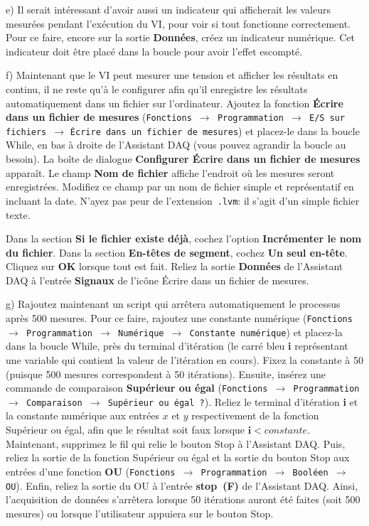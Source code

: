 \documentclass[canadien,12pt,oneside,letterpaper]{article}
\begin{document}
e) Il serait intéressant d'avoir aussi un indicateur qui afficherait les valeurs mesurées pendant l'exécution du VI, pour voir si tout fonctionne correctement. Pour ce faire, encore sur la sortie \textbf{Données}, créez un indicateur numérique. Cet indicateur doit être placé dans la boucle pour avoir l'effet escompté.

f) Maintenant que le VI peut mesurer une tension et afficher les résultats en continu, il ne reste qu'à le configurer afin qu'il enregistre les résultats automatiquement dans un fichier sur l'ordinateur. Ajoutez la fonction \textbf{Écrire dans un fichier de mesures} (\texttt{Fonctions $\rightarrow$ Programmation $\rightarrow$ E/S sur fichiers $\rightarrow$} \texttt{Écrire dans un fichier de mesures}) et placez-le dans la boucle While, en bas à droite de l'Assistant DAQ (vous pouvez agrandir la boucle au besoin). La boîte de dialogue \textbf{Configurer Écrire dans un fichier de mesures} apparaît. Le champ \textbf{Nom de fichier} affiche l'endroit où les mesures seront enregistrées. Modifiez ce champ par un nom de fichier simple et représentatif en incluant la date. N'ayez pas peur de l'extension~\texttt{.lvm}: il s'agit d'un simple fichier texte.

Dans la section \textbf{Si le fichier existe déjà}, cochez l'option \textbf{Incrémenter le nom du fichier}. Dans la section \textbf{En-têtes de segment}, cochez \textbf{Un seul en-tête}. Cliquez sur \textbf{OK} lorsque tout est fait. Reliez la sortie \textbf{Données} de l'Assistant DAQ à l'entrée \textbf{Signaux} de l'icône Écrire dans un fichier de mesures.

g) Rajoutez maintenant un script qui arrêtera automatiquement le processus après 500 mesures. Pour ce faire, rajoutez une constante numérique (\texttt{Fonctions $\rightarrow$ Programmation $\rightarrow$ Numérique $\rightarrow$ Constante numérique}) et placez-la dans la boucle While, près du terminal d'itération (le carré bleu \textbf{i} représentant une variable qui contient la valeur de l'itération en cours). Fixez la constante à 50 (puisque 500 mesures correspondent à 50 itérations). Ensuite, insérez une commande de comparaison \textbf{Supérieur ou égal} (\texttt{Fonctions $\rightarrow$ Programmation $\rightarrow$ Comparaison $\rightarrow$ Supérieur ou égal~?}). Reliez le terminal d'itération \textbf{i} et la constante numérique aux entrées $x$ et $y$ respectivement de la fonction Supérieur ou égal, afin que le résultat soit faux lorsque $\mathbf{i}<constante$. Maintenant, supprimez le fil qui relie le bouton Stop à l'Assistant DAQ. Puis, reliez la sortie de la fonction Supérieur ou égal et la sortie du bouton Stop aux entrées d'une fonction \textbf{OU} (\texttt{Fonctions $\rightarrow$ Programmation $\rightarrow$ Booléen $\rightarrow$ OU}). Enfin, reliez la sortie du OU à l'entrée \textbf{stop~(F)} de l'Assistant DAQ. Ainsi, l'acquisition de données s'arrêtera lorsque 50 itérations auront été faites (soit 500 mesures) ou lorsque l'utilisateur appuiera sur le bouton Stop.
\end{document}
